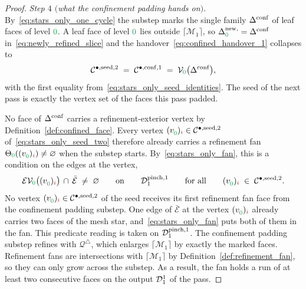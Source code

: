 \documentclass[a4paper, 12pt]{article}
\makeatletter
\newcommand{\quadriF}{\mathcal{Q}^{\triangle}}                   %
\DeclareRobustCommand{\candV}[1][]{\mathcal{C}^{\bullet\ifx\@empty#1\@empty\else,#1\fi}}
\newcommand{\green}{\color{ForestGreen}}
\newcommand{\brickred}{\color{BrickRed}}
\newcommand{\V}{\mathcal{V}}
\newcommand{\E}{\mathcal{E}}
\DeclareRobustCommand{\simplexsubsetTwo}[2][]{\Delta\ifx\@empty#1\@empty\else^{#1}\fi_{#2}}
\DeclareRobustCommand{\simplexsubsetNew}[2][]{\Delta^{\mathrm{new}\ifx\@empty#1\@empty\else,#1\fi}_{#2}}
\newcommand{\vertex}[2]{\freeQ{v}{}{#1}{#2}}
\newcommand{\EVl}[1]{\E\V_{#1}}
\newcommand{\coarseIdxone}{{\brickred i}}
\newcommand{\lzero}{{\green 0}}
\newcommand{\freeQ}[4]{ ( {#1}^{#2}_{#3} )_{#4}}
\newcommand{\M}{\mathcal{M}}
\theoremstyle{definition}
\theoremstyle{plain}
\numberwithin{equation}{section}
\newcommand{\ancestorPatch}[1]{\lceil #1 \rceil}
\DeclareRobustCommand{\domseq}[1][]{\mathcal{D}\ifx\@empty#1\@empty\else_{#1}\fi}
\newcommand{\refFan}[1]{\Theta_{#1}}                        %
\makeatother
\begin{document}
\begin{proof}
    \emph{Step $4$ $($what the confinement padding hands on$)$.} By~\eqref{eq:stars_only_one_cycle} the substep marks the single family $\simplexsubsetTwo[\mathrm{conf}]{}$ of leaf faces of level $\lzero$. A leaf face of level $\lzero$ lies outside $\ancestorPatch{\M_1}$, so $\simplexsubsetNew{\lzero} = \simplexsubsetTwo[\mathrm{conf}]{}$ in~\eqref{eq:newly_refined_slice} and the handover~\eqref{eq:confined_handover_1} collapses to
    \begin{equation}
        \label{eq:stars_only_seed_two}
        \candV[\mathrm{seed},2] \; = \; \candV[\mathrm{conf},1] \; = \; \V_\lzero \big( \simplexsubsetTwo[\mathrm{conf}]{} \big) ,
    \end{equation}
    with the first equality from~\eqref{eq:stars_only_seed_identities}. The seed of the next pass is exactly the vertex set of the faces this pass padded.

    No face of $\simplexsubsetTwo[\mathrm{conf}]{}$ carries a refinement-exterior vertex by Definition~\ref{def:confined_face}. Every vertex $\vertex{\lzero}{\coarseIdxone} \in \candV[\mathrm{seed},2]$ of~\eqref{eq:stars_only_seed_two} therefore already carries a refinement fan $\refFan{\lzero}(\vertex{\lzero}{\coarseIdxone}) \neq \varnothing$ when the substep starts. By~\eqref{eq:stars_only_fan}, this is a condition on the edges at the vertex,
    \begin{equation}
        \label{eq:confined_needs_fan}
        \EVl{\lzero} \big( \vertex{\lzero}{\coarseIdxone} \big) \, \cap \, \bar{\E} \; \neq \; \varnothing
        \qquad \text{on} \qquad \domseq[1]^{\mathrm{pinch},1}
        \qquad \text{for all} \qquad
        \vertex{\lzero}{\coarseIdxone} \; \in \; \candV[\mathrm{seed},2] .
    \end{equation}
    No vertex $\vertex{\lzero}{\coarseIdxone} \in \candV[\mathrm{seed},2]$ of the seed receives its first refinement fan face from the confinement padding substep. One edge of $\bar{\E}$ at the vertex $\vertex{\lzero}{\coarseIdxone}$ already carries two faces of the mesh star, and~\eqref{eq:stars_only_fan} puts both of them in the fan. This predicate reading is taken on $\domseq[1]^{\mathrm{pinch},1}$. The confinement padding substep refines with $\quadriF$, which enlarges $\ancestorPatch{\M_1}$ by exactly the marked faces. Refinement fans are intersections with $\ancestorPatch{\M_1}$ by Definition~\ref{def:refinement_fan}, so they can only grow across the substep. As a result, the fan holds a run of at least two consecutive faces on the output $\domseq[1]^{1}$ of the pass.


\end{proof}
\end{document}
